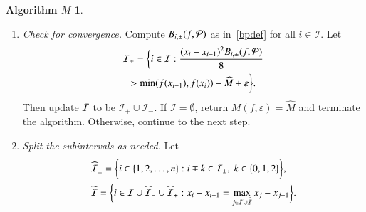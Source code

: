 \documentclass[review]{elsarticle}
\newcommand{\abstol}{\varepsilon}
\theoremstyle{definition}
\newtheorem*{algoM}{Algorithm $M$}
\newcommand{\minfii}{\min(f(x_{i-1}), f(x_i))} %
\begin{document}
\begin{algoM}
	\begin{enumerate}[\em Step 1.]%
		\item \label{stagemin1} \emph{Check for convergence.}
		Compute $B_{i,\pm}(f,\mathcal{P})$ as in~\eqref{bpdef} for all $i \in \mathcal{I}$.
		Let
		\begin{multline*}
		\mathcal{I}_\pm = \biggl\{i \in \mathcal{I}:  \frac{(x_i - x_{i-1})^2B_{i,\pm}(f,\cp)}{8}  \\
		> \minfii - \widehat{M} + \abstol \biggr\}.
		\end{multline*}
		Then update $\mathcal{I}$ to be $\mathcal{I}_+ \cup \mathcal{I}_-$.  If $\mathcal{I} = \emptyset$, return $M(f,\abstol) = \widehat{M}$ and terminate the algorithm.
		Otherwise, continue to the next step.
		\item \label{stagemin2} \emph{Split the subintervals as needed.}
Let
\begin{gather*}
\widehat{\mathcal{I}}_{\pm} = \biggl\{i \in \{1,2,\ldots,n\}: i\mp k \in \mathcal{I}_{\pm}, \ k \in \{0,1,2\}   \biggr\}, \quad  \\
\widetilde{\mathcal{I}}=\biggl\{i \in \mathcal{I} \cup \widehat{\mathcal{I}}_- \cup \widehat{\mathcal{I}}_+ : x_i - x_{i-1}=\max\limits_{j \in \mathcal{I} \cup \widehat{\mathcal{I}} } x_j-x_{j-1} \biggr\}.
\end{gather*}

\end{enumerate}
\end{algoM}
\end{document}

